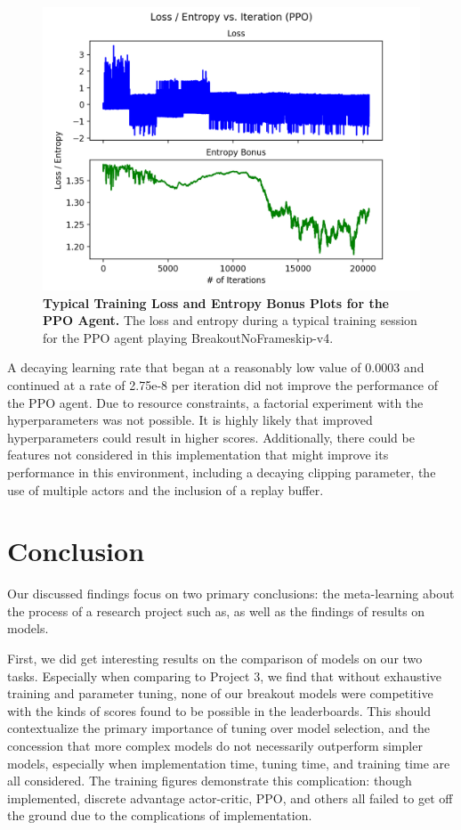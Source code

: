 \documentclass[conference]{IEEEtran}
\begin{document}
\begin{figure}[htbp]
\centerline{\includegraphics[scale=0.5]{PPO_Train_Loss_Entropy_Plot_Breakout_Typical.png}}
\caption{\textbf{Typical Training Loss and Entropy Bonus Plots for the PPO Agent.}  The loss and entropy during a typical training session for the PPO agent playing BreakoutNoFrameskip-v4.}
\label{fig:PPOTypicalTrainLossEntropyBreakout}
\end{figure}

A decaying learning rate that began at a reasonably low value of 0.0003 and continued at a rate of 2.75e-8 per iteration did not improve the performance of the PPO agent. Due to resource constraints, a factorial experiment with the hyperparameters was not possible. It is highly likely that improved hyperparameters could result in higher scores. Additionally, there could be features not considered in this implementation that might improve its performance in this environment, including a decaying clipping parameter, the use of multiple actors and the inclusion of a replay buffer.

\section{Conclusion} \label{conclusion}
Our discussed findings focus on two primary conclusions: the meta-learning about the process of a research project such as, as well as the findings of results on models.

First, we did get interesting results on the comparison of models on our two tasks. Especially when comparing to Project 3, we find that without exhaustive training and parameter tuning, none of our breakout models were competitive with the kinds of scores found to be possible in the leaderboards. This should contextualize the primary importance of tuning over model selection, and the concession that more complex models do not necessarily outperform simpler models, especially when implementation time, tuning time, and training time are all considered. The training figures demonstrate this complication: though implemented, discrete advantage actor-critic, PPO, and others all failed to get off the ground due to the complications of implementation.
\end{document}
